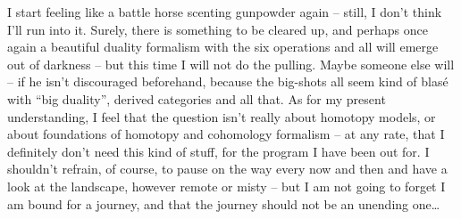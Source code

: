 I start feeling like a battle horse scenting gunpowder again -- still,
I don't think I'll run into it. Surely, there is something to be
cleared up, and perhaps once again a beautiful duality formalism with
the six operations and all will emerge out of darkness -- but this
time I will not do the pulling. Maybe someone else will -- if he isn't
discouraged beforehand, because the big-shots all seem kind of blasé
with ``big duality'', derived categories and all that. As for my
present understanding, I feel that the question isn't really about
homotopy models, or about foundations of homotopy and cohomology
formalism -- at any rate, that I definitely don't need this kind of
stuff, for the program I have been out for. I shouldn't refrain, of
course, to pause on the way every now and then and have a look at the
landscape, however remote or misty -- but I am not going to forget I
am bound for a journey, and that the journey should not be an unending
one\dots

\bigbreak

\noindent\hfill{}\par

